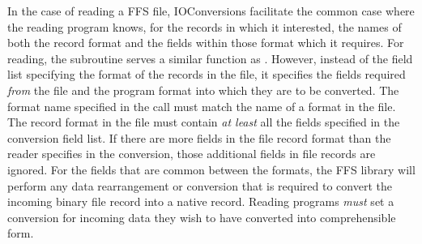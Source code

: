 In the case of reading a FFS file, IOConversions facilitate the common case
where the reading program knows, for the records in which it interested, the
names of both the record format and the fields within those format which it
requires.  For reading, the subroutine  serves a
similar function as .  However, instead of
the field list specifying the format of the records in the file, it specifies
the fields required {\it from} the file and the program format into which they
are to be converted.  The format name specified in the
 call must match the name of a format in the file.
The record format in the file must contain {\it at least} all the fields
specified in the conversion field list.  If there are more fields in the file
record format than the reader specifies in the conversion, those additional
fields in file records are ignored.  For the fields that are common between
the formats, the FFS library will perform any data rearrangement or conversion
that is required to convert the incoming binary file record into a native
record.  Reading programs {\it must} set a conversion for incoming data they
wish to have converted into comprehensible form.  

